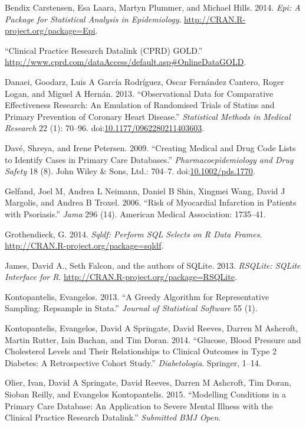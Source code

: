 \documentclass[]{article}
\begin{document}
Bendix Carstensen, Esa Laara, Martyn Plummer, and Michael Hills. 2014.
\emph{Epi: A Package for Statistical Analysis in Epidemiology}.
\url{http://CRAN.R-project.org/package=Epi}.

``Clinical Practice Research Datalink (CPRD) GOLD.''
\url{http://www.cprd.com/dataAccess/default.asp\#OnlineDataGOLD}.

Danaei, Goodarz, Luis A García Rodríguez, Oscar Fernández Cantero, Roger
Logan, and Miguel A Hernán. 2013. ``Observational Data for Comparative
Effectiveness Research: An Emulation of Randomised Trials of Statins and
Primary Prevention of Coronary Heart Disease.'' \emph{Statistical
Methods in Medical Research} 22 (1): 70--96.
doi:\href{http://dx.doi.org/10.1177/0962280211403603}{10.1177/0962280211403603}.

Davé, Shreya, and Irene Petersen. 2009. ``Creating Medical and Drug Code
Lists to Identify Cases in Primary Care Databases.''
\emph{Pharmacoepidemiology and Drug Safety} 18 (8). John Wiley \& Sons,
Ltd.: 704--7.
doi:\href{http://dx.doi.org/10.1002/pds.1770}{10.1002/pds.1770}.

Gelfand, Joel M, Andrea L Neimann, Daniel B Shin, Xingmei Wang, David J
Margolis, and Andrea B Troxel. 2006. ``Risk of Myocardial Infarction in
Patients with Psoriasis.'' \emph{Jama} 296 (14). American Medical
Association: 1735--41.

Grothendieck, G. 2014. \emph{Sqldf: Perform SQL Selects on R Data
Frames}. \url{http://CRAN.R-project.org/package=sqldf}.

James, David A., Seth Falcon, and the authors of SQLite. 2013.
\emph{RSQLite: SQLite Interface for R}.
\url{http://CRAN.R-project.org/package=RSQLite}.

Kontopantelis, Evangelos. 2013. ``A Greedy Algorithm for Representative
Sampling: Repsample in Stata.'' \emph{Journal of Statistical Software}
55 (1).

Kontopantelis, Evangelos, David A Springate, David Reeves, Darren M
Ashcroft, Martin Rutter, Iain Buchan, and Tim Doran. 2014. ``Glucose,
Blood Pressure and Cholesterol Levels and Their Relationships to
Clinical Outcomes in Type 2 Diabetes: A Retrospective Cohort Study.''
\emph{Diabetologia}. Springer, 1--14.

Olier, Ivan, David A Springate, David Reeves, Darren M Ashcroft, Tim
Doran, Sioban Reilly, and Evangelos Kontopantelis. 2015. ``Modelling
Conditions in a Primary Care Database: An Application to Severe Mental
Illness with the Clinical Practice Research Datalink.'' \emph{Submitted
BMJ Open}.
\end{document}
